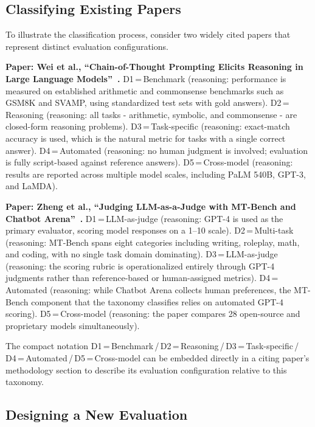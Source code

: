 \documentclass[journal]{IEEEtran}
\begin{document}
\subsection{Classifying Existing Papers}
\label{subsec:classify}

To illustrate the classification process, consider two widely cited papers
that represent distinct evaluation configurations.

\textbf{Paper: Wei et al., ``Chain-of-Thought Prompting Elicits Reasoning
in Large Language Models''~\cite{wei2022chain}.}
D1\,=\,Benchmark (reasoning: performance is measured on established
arithmetic and commonsense benchmarks such as GSM8K and SVAMP, using
standardized test sets with gold answers).
D2\,=\,Reasoning (reasoning: all tasks - arithmetic, symbolic, and
commonsense - are closed-form reasoning problems).
D3\,=\,Task-specific (reasoning: exact-match accuracy is used, which is
the natural metric for tasks with a single correct answer).
D4\,=\,Automated (reasoning: no human judgment is involved; evaluation
is fully script-based against reference answers).
D5\,=\,Cross-model (reasoning: results are reported across multiple model
scales, including PaLM 540B, GPT-3, and LaMDA).

\textbf{Paper: Zheng et al., ``Judging LLM-as-a-Judge with MT-Bench and
Chatbot Arena''~\cite{zheng2023judging}.}
D1\,=\,LLM-as-judge (reasoning: GPT-4 is used as the primary evaluator,
scoring model responses on a 1--10 scale).
D2\,=\,Multi-task (reasoning: MT-Bench spans eight categories including
writing, roleplay, math, and coding, with no single task domain
dominating).
D3\,=\,LLM-as-judge (reasoning: the scoring rubric is operationalized
entirely through GPT-4 judgments rather than reference-based or
human-assigned metrics).
D4\,=\,Automated (reasoning: while Chatbot Arena collects human
preferences, the MT-Bench component that the taxonomy classifies relies
on automated GPT-4 scoring).
D5\,=\,Cross-model (reasoning: the paper compares 28 open-source and
proprietary models simultaneously).

The compact notation D1\,=\,Benchmark\,/\,D2\,=\,Reasoning\,/\,D3\,=\,Task-specific\,/\,D4\,=\,Automated\,/\,D5\,=\,Cross-model
can be embedded directly in a citing paper's methodology section to describe
its evaluation configuration relative to this taxonomy.

\subsection{Designing a New Evaluation}
\label{subsec:design}
\end{document}
